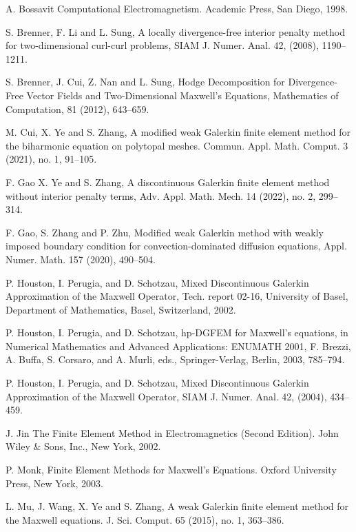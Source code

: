 \documentclass[11pt]{amsart}
\begin{document}
\begin{thebibliography}{99}

{  A. Bossavit}
 Computational Electromagnetism. Academic Press, San Diego, 1998.

{  S. Brenner, F. Li and L.  Sung}, {  A locally divergence-free
interior penalty method for two-dimensional curl-curl problems},
SIAM J. Numer. Anal. 42, (2008), 1190--1211.

{   S. Brenner, J. Cui, Z. Nan and L. Sung},
 {  Hodge Decomposition for Divergence-Free Vector Fields and
 Two-Dimensional Maxwell's Equations, Mathematics of Computation}, 81 (2012),
 643--659.


 M. Cui, X. Ye and S. Zhang, 
 A modified weak Galerkin finite element method for the biharmonic equation on polytopal meshes. Commun. Appl. Math. Comput. 3 (2021), no. 1, 91--105.

 F. Gao X. Ye and S. Zhang,
 A discontinuous Galerkin finite element method without interior penalty terms,
 Adv. Appl. Math. Mech. 14 (2022), no. 2, 299--314. 

 F. Gao, S. Zhang and P. Zhu, 
 Modified weak Galerkin method with weakly imposed boundary condition for convection-dominated diffusion equations, Appl. Numer. Math. 157 (2020), 490--504.

{  P. Houston, I. Perugia, and D. Schotzau},
{  Mixed Discontinuous Galerkin Approximation of the Maxwell Operator},
Tech. report 02-16, University of Basel, Department of Mathematics,
Basel, Switzerland, 2002.

{  P. Houston, I. Perugia, and D. Schotzau}, {  hp-DGFEM for
Maxwell's equations}, in Numerical Mathematics and Advanced
Applications: ENUMATH 2001, F. Brezzi, A. Buffa, S. Corsaro, and A.
Murli, eds., Springer-Verlag, Berlin, 2003, 785--794.

{  P. Houston, I. Perugia, and D. Schotzau}, {  Mixed
Discontinuous Galerkin Approximation of the Maxwell Operator}, SIAM
J. Numer. Anal. 42, (2004), 434--459.

{  J. Jin} The Finite Element Method in Electromagnetics (Second
Edition). John Wiley $\&$ Sons, Inc., New York, 2002.

{  P. Monk}, Finite Element Methods for Maxwell's Equations.
Oxford University Press, New York, 2003.

{  L. Mu, J. Wang,  X. Ye and S. Zhang},  A weak Galerkin finite element method for the Maxwell equations. J. Sci. Comput. 65 (2015), no. 1, 363--386. 
 


\end{thebibliography}
\end{document}
